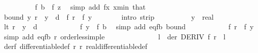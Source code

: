 \begin{isabellebody}
\ \ \ \ \ \ \ \ \isamarkupfalse%
\ {\isachardoublequoteopen}f\ b\ {\isasymle}\ f\ z{\isachardoublequoteclose}\ \isamarkupfalse%
\ {\isacharparenleft}{\kern0pt}simp\ add{\isacharcolon}{\kern0pt}\ fx{\isacharprime}{\kern0pt}\ x{\isacharprime}{\kern0pt}{\isacharunderscore}{\kern0pt}min\ that{\isacharparenright}{\kern0pt}\isanewline
\ \ \ \ \ \ \isamarkupfalse%
\isanewline
\ \ \ \ \ \ \isamarkupfalse%
\ bound{\isacharprime}{\kern0pt}{\isacharcolon}{\kern0pt}\ {\isachardoublequoteopen}{\isasymforall}y{\isachardot}{\kern0pt}\ {\isasymbar}r\ {\isacharminus}{\kern0pt}\ y{\isasymbar}\ {\isacharless}{\kern0pt}\ d\ {\isasymlongrightarrow}\ f\ r\ {\isacharequal}{\kern0pt}\ f\ y{\isachardoublequoteclose}\isanewline
\ \ \ \ \ \ \isamarkupfalse%
\ {\isacharparenleft}{\kern0pt}intro\ strip{\isacharparenright}{\kern0pt}\isanewline
\ \ \ \ \ \ \ \ \isamarkupfalse%
\ y\ {\isacharcolon}{\kern0pt}{\isacharcolon}{\kern0pt}\ real\isanewline
\ \ \ \ \ \ \ \ \isamarkupfalse%
\ lt{\isacharcolon}{\kern0pt}\ {\isachardoublequoteopen}{\isasymbar}r\ {\isacharminus}{\kern0pt}\ y{\isasymbar}\ {\isacharless}{\kern0pt}\ d{\isachardoublequoteclose}\isanewline
\ \ \ \ \ \ \ \ \isamarkupfalse%
\ \isamarkupfalse%
\ {\isachardoublequoteopen}f\ y\ {\isacharequal}{\kern0pt}\ f\ b{\isachardoublequoteclose}\ \isamarkupfalse%
\ {\isacharparenleft}{\kern0pt}simp\ add{\isacharcolon}{\kern0pt}\ eq{\isacharunderscore}{\kern0pt}fb\ bound{\isacharparenright}{\kern0pt}\isanewline
\ \ \ \ \ \ \ \ \isamarkupfalse%
\ \isamarkupfalse%
\ {\isachardoublequoteopen}f\ r\ {\isacharequal}{\kern0pt}\ f\ y{\isachardoublequoteclose}\ \isamarkupfalse%
\ {\isacharparenleft}{\kern0pt}simp\ add{\isacharcolon}{\kern0pt}\ eq{\isacharunderscore}{\kern0pt}fb\ r\ order{\isacharunderscore}{\kern0pt}less{\isacharunderscore}{\kern0pt}imp{\isacharunderscore}{\kern0pt}le{\isacharparenright}{\kern0pt}\isanewline
\ \ \ \ \ \ \isamarkupfalse%
\isanewline
\ \ \ \ \ \ \isamarkupfalse%
\ l\ \ der{\isacharcolon}{\kern0pt}\ {\isachardoublequoteopen}DERIV\ f\ r\ {\isacharcolon}{\kern0pt}{\isachargreater}{\kern0pt}\ l{\isachardoublequoteclose}\isanewline
\ \ \ \ \ \ \ \ \isamarkupfalse%
\ derf\ differentiable{\isacharunderscore}{\kern0pt}def\ r{\isacharparenleft}{\kern0pt}{}{\isacharparenright}{\kern0pt}\ r{\isacharparenleft}{\kern0pt}{}{\isacharparenright}{\kern0pt}\ real{\isacharunderscore}{\kern0pt}differentiable{\isacharunderscore}{\kern0pt}def\ \isamarkupfalse%

\end{isabellebody}
